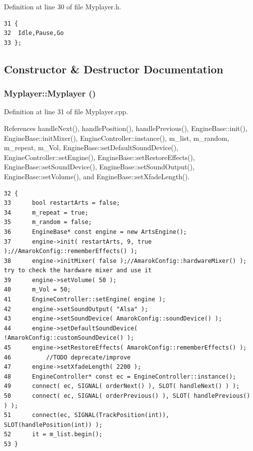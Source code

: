 Definition at line 30 of file Myplayer.h.



\footnotesize\begin{verbatim}31 {
32  Idle,Pause,Go
33 };
\end{verbatim}\normalsize 


\subsection{Constructor \& Destructor Documentation}
\subsubsection{\setlength{\rightskip}{0pt plus 5cm}Myplayer::Myplayer ()}\label{classMyplayer_Myplayera0}




Definition at line 31 of file Myplayer.cpp.

References handle\-Next(), handle\-Position(), handle\-Previous(), Engine\-Base::init(), Engine\-Base::init\-Mixer(), Engine\-Controller::instance(), m\_\-list, m\_\-random, m\_\-repeat, m\_\-Vol, Engine\-Base::set\-Default\-Sound\-Device(), Engine\-Controller::set\-Engine(), Engine\-Base::set\-Restore\-Effects(), Engine\-Base::set\-Sound\-Device(), Engine\-Base::set\-Sound\-Output(), Engine\-Base::set\-Volume(), and Engine\-Base::set\-Xfade\-Length().



\footnotesize\begin{verbatim}32 {
33      bool restartArts = false;
34      m_repeat = true;
35      m_random = false;
36      EngineBase* const engine = new ArtsEngine();
37      engine->init( restartArts, 9, true );//AmarokConfig::rememberEffects() );
38      engine->initMixer( false );//AmarokConfig::hardwareMixer() ); try to check the hardware mixer and use it 
39      engine->setVolume( 50 );
40      m_Vol = 50;
41      EngineController::setEngine( engine );
42      engine->setSoundOutput( "Alsa" );
43      engine->setSoundDevice( AmarokConfig::soundDevice() );
44      engine->setDefaultSoundDevice( !AmarokConfig::customSoundDevice() );
45      engine->setRestoreEffects( AmarokConfig::rememberEffects() );
46          //TODO deprecate/improve
47      engine->setXfadeLength( 2200 );
48      EngineController* const ec = EngineController::instance();
49      connect( ec, SIGNAL( orderNext() ), SLOT( handleNext() ) );
50      connect( ec, SIGNAL( orderPrevious() ), SLOT( handlePrevious() ) );      
51      connect(ec, SIGNAL(TrackPosition(int)), SLOT(handlePosition(int)) );
52      it = m_list.begin();
53 }
\end{verbatim}\normalsize 


